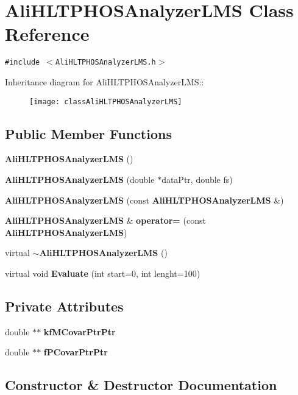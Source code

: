 \section{Ali\-HLTPHOSAnalyzer\-LMS Class Reference}
\label{classAliHLTPHOSAnalyzerLMS}
{\tt \#include $<$Ali\-HLTPHOSAnalyzer\-LMS.h$>$}

Inheritance diagram for Ali\-HLTPHOSAnalyzer\-LMS::\begin{figure}[H]
\begin{center}
\leavevmode
\texttt{[image: classAliHLTPHOSAnalyzerLMS]}
\end{center}
\end{figure}
\subsection*{Public Member Functions}
\begin{CompactItemize}
\item 
{\bf Ali\-HLTPHOSAnalyzer\-LMS} ()
\item 
{\bf Ali\-HLTPHOSAnalyzer\-LMS} (double $\ast$data\-Ptr, double fs)
\item 
{\bf Ali\-HLTPHOSAnalyzer\-LMS} (const {\bf Ali\-HLTPHOSAnalyzer\-LMS} \&)
\item 
{\bf Ali\-HLTPHOSAnalyzer\-LMS} \& {\bf operator=} (const {\bf Ali\-HLTPHOSAnalyzer\-LMS})
\item 
virtual {\bf $\sim$Ali\-HLTPHOSAnalyzer\-LMS} ()
\item 
virtual void {\bf Evaluate} (int start=0, int lenght=100)
\end{CompactItemize}
\subsection*{Private Attributes}
\begin{CompactItemize}
\item 
double $\ast$$\ast$ {\bf kf\-MCovar\-Ptr\-Ptr}
\item 
double $\ast$$\ast$ {\bf f\-PCovar\-Ptr\-Ptr}
\end{CompactItemize}


\subsection{Constructor \& Destructor Documentation}
